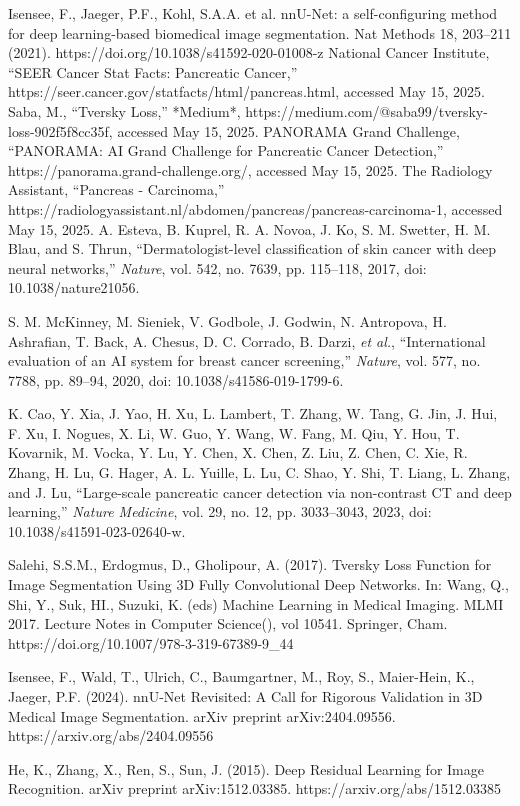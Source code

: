 \documentclass[conference]{IEEEtran}
\begin{document}
\begin{thebibliography}{00}
 Isensee, F., Jaeger, P.F., Kohl, S.A.A. et al. nnU-Net: a self-configuring method for deep learning-based biomedical image segmentation. Nat Methods 18, 203–211 (2021). https://doi.org/10.1038/s41592-020-01008-z
 National Cancer Institute, ``SEER Cancer Stat Facts: Pancreatic Cancer,'' https://seer.cancer.gov/statfacts/html/pancreas.html, accessed May 15, 2025.
 Saba, M., ``Tversky Loss,'' *Medium*, https://medium.com/@saba99/tversky-loss-902f5f8cc35f, accessed May 15, 2025.
 PANORAMA Grand Challenge, ``PANORAMA: AI Grand Challenge for Pancreatic Cancer Detection,'' https://panorama.grand-challenge.org/, accessed May 15, 2025.
 The Radiology Assistant, ``Pancreas - Carcinoma,'' https://radiologyassistant.nl/abdomen/pancreas/pancreas-carcinoma-1, accessed May 15, 2025.
 A. Esteva, B. Kuprel, R. A. Novoa, J. Ko, S. M. Swetter, H. M. Blau, and S. Thrun, ``Dermatologist-level classification of skin cancer with deep neural networks,'' \textit{Nature}, vol. 542, no. 7639, pp. 115--118, 2017, doi: 10.1038/nature21056.

 S. M. McKinney, M. Sieniek, V. Godbole, J. Godwin, N. Antropova, H. Ashrafian, T. Back, A. Chesus, D. C. Corrado, B. Darzi, \textit{et al.}, ``International evaluation of an AI system for breast cancer screening,'' \textit{Nature}, vol. 577, no. 7788, pp. 89--94, 2020, doi: 10.1038/s41586-019-1799-6.

 K. Cao, Y. Xia, J. Yao, H. Xu, L. Lambert, T. Zhang, W. Tang, G. Jin, J. Hui, F. Xu, I. Nogues, X. Li, W. Guo, Y. Wang, W. Fang, M. Qiu, Y. Hou, T. Kovarnik, M. Vocka, Y. Lu, Y. Chen, X. Chen, Z. Liu, Z. Chen, C. Xie, R. Zhang, H. Lu, G. Hager, A. L. Yuille, L. Lu, C. Shao, Y. Shi, T. Liang, L. Zhang, and J. Lu, ``Large-scale pancreatic cancer detection via non-contrast CT and deep learning,'' \textit{Nature Medicine}, vol. 29, no. 12, pp. 3033--3043, 2023, doi: 10.1038/s41591-023-02640-w.


 Salehi, S.S.M., Erdogmus, D., Gholipour, A. (2017). Tversky Loss Function for Image Segmentation Using 3D Fully Convolutional Deep Networks. In: Wang, Q., Shi, Y., Suk, HI., Suzuki, K. (eds) Machine Learning in Medical Imaging. MLMI 2017. Lecture Notes in Computer Science(), vol 10541. Springer, Cham. https://doi.org/10.1007/978-3-319-67389-9\_44

 Isensee, F., Wald, T., Ulrich, C., Baumgartner, M., Roy, S., Maier-Hein, K., Jaeger, P.F. (2024). nnU-Net Revisited: A Call for Rigorous Validation in 3D Medical Image Segmentation. arXiv preprint arXiv:2404.09556. https://arxiv.org/abs/2404.09556 

 He, K., Zhang, X., Ren, S., Sun, J. (2015). Deep Residual Learning for Image Recognition. arXiv preprint arXiv:1512.03385. https://arxiv.org/abs/1512.03385


\end{thebibliography}
\end{document}
